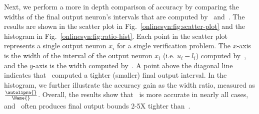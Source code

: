 
Next, we perform a more in depth comparison of accuracy by comparing the widths
of the final output neuron's intervals that are computed by~\autolipra{}
and~\Name{}. The results are shown in the scatter plot in
Fig.~\ref{onlinesyn:fig:scatter-plot} and the histogram in
Fig.~\ref{onlinesyn:fig:ratio-hist}.
Each point in the scatter plot represents a single output neuron $ x_i
$ for a single verification problem. The $ x $-axis is the width of the
interval of the output neuron $ x_i $ (i.e. $ u_i - l_i $) computed by~\Name{},
and the $ y $-axis is the width computed by~\autolipra{}. A point above the
diagonal line
indicates that~\Name{} computed a tighter (smaller) final output interval.
%
In the histogram, we further illustrate the accuracy gain as the width ratio,
measured as $ \frac{\autolipra{}}{\Name{}} $.
%
Overall, the results show that~\Name{} is more accurate in nearly all cases,
and~\Name{} often produces final output bounds 2-5X tighter than~\autolipra{}.

%

